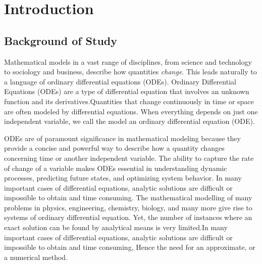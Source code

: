 \setlength{\headheight}{14.49998pt}
\addtolength{\topmargin}{-2.49998pt}
\chapter{Introduction}



\section{Background of Study}
Mathematical models in a vast range of disciplines, from science and technology to sociology and business, describe how quantities \textsl{change}. This leads naturally to a language of ordinary differential equations (ODEs).
Ordinary Differential Equations (ODEs) are a type of differential equation that involves an unknown function and its derivatives.Quantities that change continuously in time or space are often modeled by differential equations. When everything depends on just one independent variable, we call the model an ordinary differential equation (ODE)\cite{fnc_multistep_methods}.

ODEs are of paramount significance in mathematical modeling because they provide a concise and powerful way to describe how a quantity changes concerning time or another independent variable. The ability to capture the rate of change of a variable makes ODEs essential in understanding dynamic processes, predicting future states, and optimizing system behavior.
In many important cases of differential equations, analytic solutions are difficult or impossible to obtain and time
consuming.
The mathematical modelling of many problems in physics, engineering, chemistry, biology, and many more give rise to systems of ordinary differential equation. Yet, the number of instances where an exact solution can be found by analytical means is very limited\cite{lambert1977}.In many important cases of differential equations, analytic solutions are difficult or impossible to obtain and time
consuming, Hence the need for an approximate, or a numerical method.

